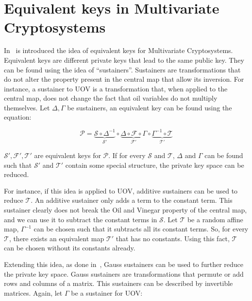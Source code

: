 \documentclass{ufsctex/ufsctex}
\begin{document}
\section{Equivalent keys in Multivariate Cryptosystems}
\label{sec:equivalentkeys}

In~\cite{wolf2005equivalent} is introduced the idea of equivalent keys for
Multivariate Cryptosystems. Equivalent keys are different private keys that
lead to the same public key. They can be found using the idea of
``sustainers''.  Sustainers are transformations that do not alter the property
present in the central map that allow its inversion. For instance, a sustainer
to UOV is a transformation that, when applied to the central map, does not
change the fact that oil variables do not multiply themselves. Let $\Delta,
\Gamma$ be sustainers, an equivalent key can be found using the equation:

\begin{equation}\label{eq:sustainer}
\mathcal{P} =
\underbrace{\mathcal{S} \circ \Delta^{-1}}_{\mathcal{S'}}
\circ
\underbrace{\Delta \circ \mathcal{F} \circ \Gamma}_{\mathcal{F'}}
\circ
\underbrace{\Gamma^{-1} \circ \mathcal{T}}_{\mathcal{T'}}
\end{equation}

$\mathcal{S'}, \mathcal{F'}, \mathcal{T'}$ are equivalent keys for
$\mathcal{P}$. If for every $\mathcal{S}$ and $\mathcal{T}$, $\Delta$ and
$\Gamma$ can be found such that $\mathcal{S'}$ and $\mathcal{T'}$ contain some
special structure, the private key space can be reduced.

For instance, if this idea is applied to UOV, additive sustainers can be used
to reduce $\mathcal{T}$. An additive sustainer only adds a term to the constant
term. This sustainer clearly does not break the Oil and Vinegar property of the
central map, and we can use it to subtract the constant terms in $\mathcal{S}$.
Let $\mathcal{T}$ be a random affine map, $\Gamma^{-1}$ can be chosen such that
it subtracts all its constant terms. So, for every $\mathcal{T}$, there exists
an equivalent map $\mathcal{T'}$ that has no constants. Using this fact,
$\mathcal{T}$ can be chosen without its constants already.

Extending this idea, as done in~\cite{wolf2011equivalent}, Gauss sustainers can
be used to further reduce the private key space. Gauss sustainers are
transformations that permute or add rows and columns of a matrix. This
sustainers can be described by invertible matrices. Again, let $\Gamma$ be a
sustainer for UOV:
\end{document}
